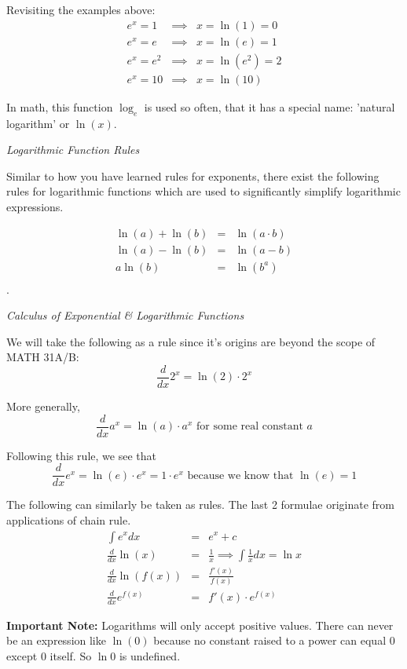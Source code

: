 \documentclass{article}
\begin{document}
Revisiting the examples above:
\begin{eqnarray*}
    e^x = 1 &\implies& x = \ln(1) = 0\\
    e^x = e &\implies& x = \ln(e) = 1\\
    e^x = e^2 &\implies& x = \ln(e^2) = 2\\
    e^x = 10 &\implies& x = \ln(10)
\end{eqnarray*}

In math, this function $\log_e$ is used so often, that it has a special name: 'natural logarithm' or $\ln(x)$.
\newline

\noindent \textit{Logarithmic Function Rules}

Similar to how you have learned rules for exponents, there exist the following rules for logarithmic functions which are used to significantly simplify logarithmic expressions.

\begin{eqnarray*}
    \ln(a) + \ln(b) &=& \ln(a\cdot b) \\
    \ln(a) - \ln(b) &=& \ln(a-b) \\
    a\ln(b) &=& \ln(b^a) \\
\end{eqnarray*}
. 

\noindent \textit{Calculus of Exponential \& Logarithmic Functions}
\newline

We will take the following as a rule since it's origins are beyond the scope of MATH 31A/B:
$$\frac{d}{dx}2^x = \ln(2)\cdot 2^x$$

\noindent More generally, 
$$\frac{d}{dx}a^x = \ln(a)\cdot a^x \text{ for some real constant } a$$

Following this rule, we see that
$$\frac{d}{dx}e^x = \ln(e)\cdot e^x = 1 \cdot e^x \text{ because we know that } \ln(e) = 1$$

The following can similarly be taken as rules. The last 2 formulae originate from applications of chain rule. 
\begin{eqnarray*}
    \int e^x dx &=& e^x + c \\
    \frac{d}{dx} \ln(x) &=& \frac{1}{x}  \implies \int{\frac{1}{x}} dx = \ln x\\
    \frac{d}{dx} \ln(f(x)) &=& \frac{f'(x)}{f(x)} \\
    \frac{d}{dx} e^{f(x)} &=& f'(x)\cdot e^{f(x)}
\end{eqnarray*}

\textbf{Important Note:} Logarithms will only accept positive values. There can never be an expression like $\ln(0)$ because no constant raised to a power can equal 0 except 0 itself. So $\ln 0$ is undefined. 
\end{document}
